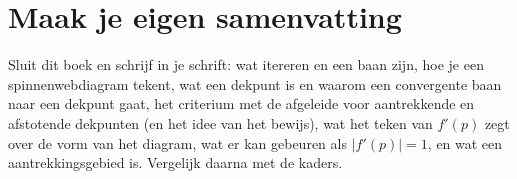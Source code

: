 
\ifzelfstudie
\section*{Maak je eigen samenvatting}
Sluit dit boek en schrijf in je schrift: wat itereren en een baan zijn, hoe je een spinnenwebdiagram tekent, wat een dekpunt is en waarom een convergente baan naar een dekpunt gaat, het criterium met de afgeleide voor aantrekkende en afstotende dekpunten (en het idee van het bewijs), wat het teken van $f'(p)$ zegt over de vorm van het diagram, wat er kan gebeuren als $|f'(p)| = 1$, en wat een aantrekkingsgebied is. Vergelijk daarna met de kaders.
\fi
